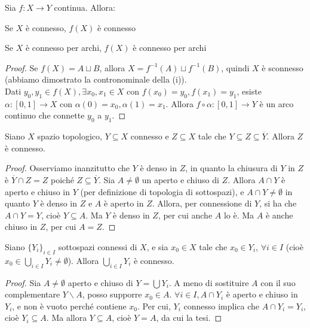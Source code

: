 \begin{prop}
Sia $f:X\longrightarrow Y$ continua. Allora:
\begin{nlist}
\item Se $X$ è connesso, $f(X)$ è connesso
\item Se $X$ è connesso per archi, $f(X)$ è connesso per archi
\end{nlist}
\end{prop}
\begin{proof}
Se $f(X)=A \sqcup B$, allora $X=f^{-1}(A) \sqcup f^{-1}(B)$, quindi $X$ è sconnesso (abbiamo dimostrato la contronominale della (i)). \\
Dati $y_0,y_1 \in f(X), \exists x_0, x_1 \in X$ con $f(x_0)=y_0, f(x_1)=y_1$, esiste $\alpha:[0,1]\longrightarrow X$ con $\alpha (0)=x_0, \alpha (1)=x_1$. Allora $f \circ \alpha:[0,1] \longrightarrow Y$ è un arco continuo che connette $y_0$ a $y_1$.
\end{proof}

\begin{lm}
Siano $X$ spazio topologico, $Y \subseteq X$ connesso e $Z \subseteq X$ tale che $Y \subseteq Z \subseteq \overline{Y}$. Allora $Z$ è connesso.
\end{lm}
\begin{proof}
Osserviamo inanzitutto che $Y$ è denso in $Z$, in quanto la chiusura di $Y$ in $Z$ è $\overline{Y} \cap Z=Z$ poiché $Z \subseteq \overline{Y}$. Sia $A \neq \emptyset$ un aperto e chiuso di $Z$. Allora $A \cap Y$ è aperto e chiuso in $Y$ (per definizione di topologia di sottospazi), e $A \cap Y \neq \emptyset$ in quanto $Y$ è denso in $Z$ e $A$ è aperto in $Z$. Allora, per connessione di $Y$, si ha che $A \cap Y=Y$, cioè $Y \subseteq A$. Ma $Y$ è denso in $Z$, per cui anche $A$ lo è. Ma $A$ è anche chiuso in $Z$, per cui $A=Z$.
\end{proof}

\begin{lm}
Siano $\{Y_i\}_{i \in I}$ sottospazi connessi di $X$, e sia $x_0 \in X$ tale che $x_0 \in Y_i$, $\forall i \in I$ (cioè $x_0 \in \bigcup _{i \in I} Y_i \neq \emptyset$). Allora $\bigcup _{i \in I} Y_i$ è connesso.
\end{lm}
\begin{proof}
Sia $A \neq \emptyset$ aperto e chiuso di $Y=\bigcup Y_i$. A meno di sostituire $A$ con il suo complementare $Y \smallsetminus A$, posso supporre $x_0 \in A$. $\forall i \in I, A \cap Y_i$ è aperto e chiuso in $Y_i$, e non è vuoto perché contiene $x_0$. Per cui, $Y_i$ connesso implica che $A \cap Y_i=Y_i$, cioè $Y_i \subseteq A$. Ma allora $Y \subseteq A$, cioè $Y=A$, da cui la tesi.
\end{proof}


